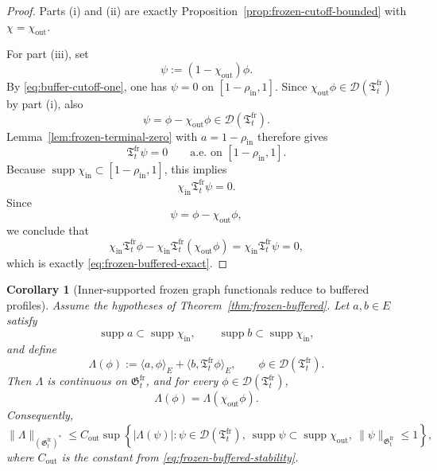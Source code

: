 \documentclass[11pt,a4paper]{amsart}
\theoremstyle{plain}
\newtheorem{corollary}[theorem]{Corollary}
\theoremstyle{definition}
\theoremstyle{remark}
\begin{document}
\begin{proof}
Parts (i) and (ii) are exactly Proposition~\ref{prop:frozen-cutoff-bounded} with
\(\chi=\chi_{\mathrm{out}}\).

For part (iii), set
\[
\psi:=(1-\chi_{\mathrm{out}})\phi.
\]
By \eqref{eq:buffer-cutoff-one}, one has \(\psi=0\) on \([1-\rho_{\mathrm{in}},1]\). Since
\(\chi_{\mathrm{out}}\phi\in\mathcal D(\mathfrak T_t^{\mathrm{fr}})\) by part (i), also
\[
\psi=\phi-\chi_{\mathrm{out}}\phi\in\mathcal D(\mathfrak T_t^{\mathrm{fr}}).
\]
Lemma~\ref{lem:frozen-terminal-zero} with \(a=1-\rho_{\mathrm{in}}\) therefore gives
\[
\mathfrak T_t^{\mathrm{fr}}\psi=0
\qquad\text{a.e. on }[1-\rho_{\mathrm{in}},1].
\]
Because \(\operatorname{supp}\chi_{\mathrm{in}}\subset [1-\rho_{\mathrm{in}},1]\), this implies
\[
\chi_{\mathrm{in}}\mathfrak T_t^{\mathrm{fr}}\psi=0.
\]
Since
\[
\psi=\phi-\chi_{\mathrm{out}}\phi,
\]
we conclude that
\[
\chi_{\mathrm{in}}\mathfrak T_t^{\mathrm{fr}}\phi
-\chi_{\mathrm{in}}\mathfrak T_t^{\mathrm{fr}}(\chi_{\mathrm{out}}\phi)
=
\chi_{\mathrm{in}}\mathfrak T_t^{\mathrm{fr}}\psi
=0,
\]
which is exactly \eqref{eq:frozen-buffered-exact}.
\end{proof}

\begin{corollary}[Inner-supported frozen graph functionals reduce to buffered profiles]
\label{cor:frozen-buffered-functional}
Assume the hypotheses of Theorem~\ref{thm:frozen-buffered}. Let \(a,b\in E\) satisfy
\[
\operatorname{supp}a\subset \operatorname{supp}\chi_{\mathrm{in}},
\qquad
\operatorname{supp}b\subset \operatorname{supp}\chi_{\mathrm{in}},
\]
and define
\[
\Lambda(\phi)
:=
\langle a,\phi\rangle_E+\langle b,\mathfrak T_t^{\mathrm{fr}}\phi\rangle_E,
\qquad
\phi\in\mathcal D(\mathfrak T_t^{\mathrm{fr}}).
\]
Then \(\Lambda\) is continuous on \(\mathfrak G_t^{\mathrm{fr}}\), and for every
\(\phi\in\mathcal D(\mathfrak T_t^{\mathrm{fr}})\),
\begin{equation}\label{eq:frozen-buffered-functional}
\Lambda(\phi)=\Lambda(\chi_{\mathrm{out}}\phi).
\end{equation}
Consequently,
\begin{equation}\label{eq:frozen-buffered-dual}
\|\Lambda\|_{(\mathfrak G_t^{\mathrm{fr}})^*}
\le
C_{\mathrm{out}}
\sup\left\{
|\Lambda(\psi)|:
\psi\in\mathcal D(\mathfrak T_t^{\mathrm{fr}}),\
\operatorname{supp}\psi\subset \operatorname{supp}\chi_{\mathrm{out}},\
\|\psi\|_{\mathfrak G_t^{\mathrm{fr}}}\le 1
\right\},
\end{equation}
where \(C_{\mathrm{out}}\) is the constant from \eqref{eq:frozen-buffered-stability}.
\end{corollary}
\end{document}
